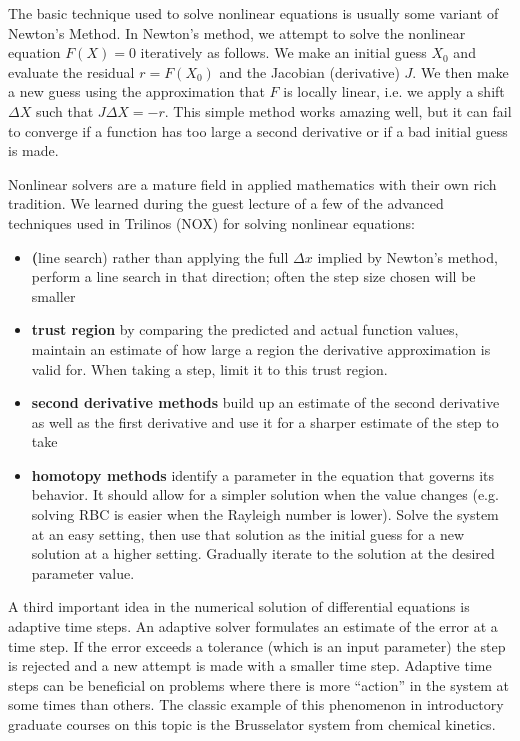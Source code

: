 \documentclass[11pt]{article} %
\begin{document}
The basic technique used to solve nonlinear equations is usually some variant of Newton's Method.
In Newton's method, we attempt to solve the nonlinear equation $F(X) = 0$ iteratively as follows.
We make an initial guess $X_0$ and evaluate the residual $r = F(X_0)$ and the Jacobian (derivative) $J$.
We then make a new guess using the approximation that $F$ is locally linear,
i.e. we apply a shift $\Delta X$ such that $J \Delta X = -r$.
This simple method works amazing well, but it can fail to converge if a function
has too large a second derivative or if a bad initial guess is made.

Nonlinear solvers are a mature field in applied mathematics with their own rich tradition.
We learned during the guest lecture of a few of the advanced techniques 
used in Trilinos (NOX) for solving nonlinear equations:
\begin{itemize}
\item{\textbf(line search)} rather than applying the full $\Delta x$ implied by Newton's method,
perform a line search in that direction; often the step size chosen will be smaller
\item{\textbf{trust region}} by comparing the predicted and actual function values,
maintain an estimate of how large a region the derivative approximation is valid
for.  When taking a step, limit it to this trust region.
\item{\textbf{second derivative methods}} build up an estimate of the second derivative as well
as the first derivative and use it for a sharper estimate of the step to take
\item{\textbf{homotopy methods}} identify a parameter in the equation that governs its behavior.
It should allow for a simpler solution when the value changes 
(e.g. solving RBC is easier when the Rayleigh number is lower).
Solve the system at an easy setting, then use that solution as the initial guess
 for a new solution at a higher setting.  Gradually iterate to the solution at
 the desired parameter value.
\end{itemize}

A third important idea in the numerical solution of differential equations is adaptive time steps.
An adaptive solver formulates an estimate of the error at a time step.  
If the error exceeds a tolerance (which is an input parameter) the step is rejected and 
a new attempt is made with a smaller time step.
Adaptive time steps can be beneficial on problems where there is more ``action'' in the
system at some times than others.  
The classic example of this phenomenon in introductory graduate courses on this
topic is the Brusselator system from chemical kinetics.
\end{document}
